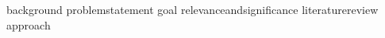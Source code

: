 \documentclass[stu,donotrepeattitle,floatsintext]{apa7}
\begin{document}
\graphicspath{ {./img/} }


\maketitle
\tableofcontents
\newpage



{background}
{problemstatement}
{goal}
{relevanceandsignificance}
{literaturereview}
{approach}





  \printbibliography



  \appendix
  \listoffigures
\end{document}
